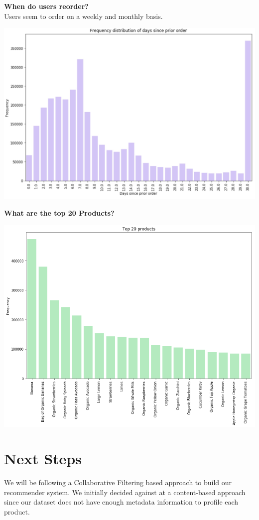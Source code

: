 \documentclass[12pt]{article}
\begin{document}
\noindent
\textbf{When do users reorder?} \\
Users seem to order on a weekly and monthly basis.
\begin{center}
	\includegraphics[scale=0.2]{days_since_prior_order}
\end{center}


\noindent
\textbf{What are the top 20 Products?} \\
\begin{center}
	\includegraphics[scale=0.4]{top_20_products.png}
\end{center}


\section{Next Steps}
We will be following a Collaborative Filtering based approach to build our recommender system. We initially decided against at a content-based approach since our dataset does not have enough metadata information to profile each product. \\
\end{document}
